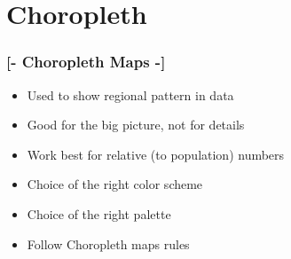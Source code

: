 \documentclass[xcolor=x11names,compress]{beamer}
\renewcommand{\(}{\begin{columns}}
\renewcommand{\)}{\end{columns}}
\newcommand{\<}[1]{\begin{column}{#1}}
\renewcommand{\>}{\end{column}}
\begin{document}
\begin{frame}
\begin{columns}
    \end{columns}
\end{frame}

\section{Choropleth}

\begin{frame} %
\frametitle{\textcolor{brique}{[-  \textbf{Choropleth Maps} -]}}
\begin{itemize}[<+-|alert@+>]
    \item  Used to show regional pattern in data   %
    \item  Good for the big picture, not for details
    \item  Work best for relative (to population) numbers
    \item  Choice of the right color scheme
    \item  Choice of the right palette %
    \item  Follow Choropleth maps rules %
\end{itemize}
\end{frame}
\end{document}
